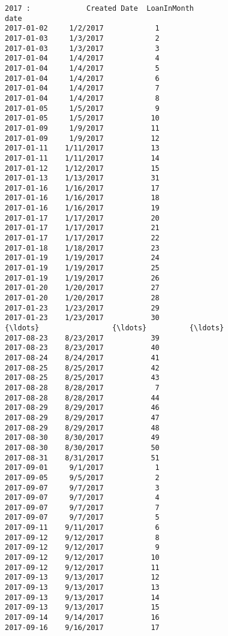 \documentclass[11pt]{article}
\begin{document}
    \begin{Verbatim}[commandchars=\\\{\}]
2017 :             Created Date  LoanInMonth
date                                
2017-01-02     1/2/2017            1
2017-01-03     1/3/2017            2
2017-01-03     1/3/2017            3
2017-01-04     1/4/2017            4
2017-01-04     1/4/2017            5
2017-01-04     1/4/2017            6
2017-01-04     1/4/2017            7
2017-01-04     1/4/2017            8
2017-01-05     1/5/2017            9
2017-01-05     1/5/2017           10
2017-01-09     1/9/2017           11
2017-01-09     1/9/2017           12
2017-01-11    1/11/2017           13
2017-01-11    1/11/2017           14
2017-01-12    1/12/2017           15
2017-01-13    1/13/2017           31
2017-01-16    1/16/2017           17
2017-01-16    1/16/2017           18
2017-01-16    1/16/2017           19
2017-01-17    1/17/2017           20
2017-01-17    1/17/2017           21
2017-01-17    1/17/2017           22
2017-01-18    1/18/2017           23
2017-01-19    1/19/2017           24
2017-01-19    1/19/2017           25
2017-01-19    1/19/2017           26
2017-01-20    1/20/2017           27
2017-01-20    1/20/2017           28
2017-01-23    1/23/2017           29
2017-01-23    1/23/2017           30
{\ldots}                 {\ldots}          {\ldots}
2017-08-23    8/23/2017           39
2017-08-23    8/23/2017           40
2017-08-24    8/24/2017           41
2017-08-25    8/25/2017           42
2017-08-25    8/25/2017           43
2017-08-28    8/28/2017            7
2017-08-28    8/28/2017           44
2017-08-29    8/29/2017           46
2017-08-29    8/29/2017           47
2017-08-29    8/29/2017           48
2017-08-30    8/30/2017           49
2017-08-30    8/30/2017           50
2017-08-31    8/31/2017           51
2017-09-01     9/1/2017            1
2017-09-05     9/5/2017            2
2017-09-07     9/7/2017            3
2017-09-07     9/7/2017            4
2017-09-07     9/7/2017            7
2017-09-07     9/7/2017            5
2017-09-11    9/11/2017            6
2017-09-12    9/12/2017            8
2017-09-12    9/12/2017            9
2017-09-12    9/12/2017           10
2017-09-12    9/12/2017           11
2017-09-13    9/13/2017           12
2017-09-13    9/13/2017           13
2017-09-13    9/13/2017           14
2017-09-13    9/13/2017           15
2017-09-14    9/14/2017           16
2017-09-16    9/16/2017           17


\end{Verbatim}
\end{document}
